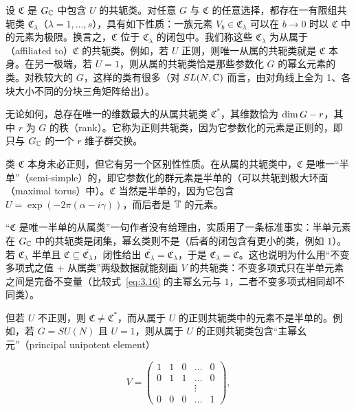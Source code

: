 设 $\mathfrak C$ 是 $G_{\mathbb{C}}$ 中包含 $U$ 的共轭类。对任意 $G$ 与 $\mathfrak C$ 的任意选择，都存在一有限组共轭类
$\mathfrak C_\lambda$（$\lambda=1,\dots, s$），具有如下性质：一族元素 $V_b\in {\mathfrak C}_\lambda$ 可以在 $b\to
0$ 时以 $\mathfrak C$ 中的元素为极限。换言之，$\mathfrak C$ 位于 $\mathfrak C_\lambda$ 的闭包中。我们称这些 ${\mathfrak C}_\lambda$ 为从属于（affiliated to）$\mathfrak C$ 的共轭类。例如，若 $U$ 正则，则唯一从属的共轭类就是 ${\mathfrak C}$ 本身。在另一极端，若 $U=1$，则从属的共轭类恰是那些参数化 $G$ 的幂幺元素的类。对秩较大的 $G$，这样的类有很多（对 $SL(N,{\mathbb{C}})$ 而言，由对角线上全为 1、各块大小不同的分块三角矩阵给出）。

无论如何，总存在唯一的维数最大的从属共轭类 ${\mathfrak C}^*$，其维数恰为
${\rm dim}\,G-r$，其中 $r$ 为 $G$ 的秩（rank）。它称为正则共轭类，因为它参数化的元素是正则的，即只与 $G_{\mathbb{C}}$ 的一个 $r$ 维子群交换。

类 $\mathfrak C$ 本身未必正则，但它有另一个区别性性质。在从属的共轭类中，$\mathfrak C$ 是唯一“半单”（semi-simple）的，即它参数化的群元素是半单的（可以共轭到极大环面（maximal torus）中）。$\mathfrak C$ 当然是半单的，因为它包含 $U=\exp(-2\pi(\alpha-i \gamma))$，而后者是 ${\mathbb{T}}$ 的元素。

\begin{yizhu}[含糊点拨]
“$\mathfrak C$ 是唯一半单的从属类”一句作者没有给理由，实质用了一条标准事实：半单元素在 $G_{\mathbb{C}}$ 中的共轭类是闭集，幂幺类则不是（后者的闭包含有更小的类，例如 $1$）。若 $\mathfrak C_\lambda$ 半单且 $\mathfrak C\subseteq\overline{\mathfrak C_\lambda}$，闭性给出 $\overline{\mathfrak C_\lambda}=\mathfrak C_\lambda$，于是 $\mathfrak C_\lambda=\mathfrak C$。这也说明为什么用“不变多项式之值 $+$ 从属类”两级数据就能刻画 $V$ 的共轭类：不变多项式只在半单元素之间是完备不变量（比较式~\eqref{eq:3.16} 的主幂幺元与 $1$，二者不变多项式相同却不同类）。
\end{yizhu}


但若 $U$ 不正则，则 ${\mathfrak C}\not={\mathfrak C}^*$，而从属于 $U$ 的正则共轭类中的元素不是半单的。例如，若 $G=SU(N)$ 且 $U=1$，则从属于 $U$ 的正则共轭类包含“主幂幺元”（principal unipotent element）

\setcounter{equation}{15}
\begin{equation}\label{eq:3.16}
  V=\left(\begin{matrix}1& 1& 0&\dots&0\\
                         0&1&1&\dots&0\\
                           & & &\vdots&\\
                           0&0&0&\dots&1\end{matrix}\right),
\end{equation}

